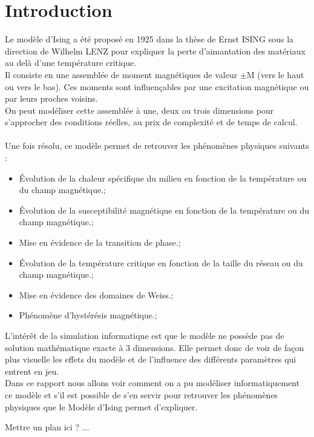 \section*{Introduction}

Le modèle d'Ising a été proposé en 1925 dans la thèse de Ernst ISING sous la direction de Wilhelm LENZ pour expliquer la perte d'aimantation des matériaux au delà d'une température critique.\\
Il consiste en une assemblée de moment magnétiques de valeur $\pm$M (vers le haut ou vers le bas). Ces moments sont influençables par une excitation magnétique ou par leurs proches voisins.\\
On peut modéliser cette assemblée à une, deux ou trois dimensions pour s'approcher des conditions réelles, au prix de complexité et de temps de calcul.\\
\\
Une fois résolu, ce modèle permet de retrouver les phénomènes physiques suivants :\\
\begin{itemize}
\item Évolution de la chaleur spécifique du milieu en fonction de la température ou du champ magnétique.;
\item Évolution de la susceptibilité magnétique en fonction de la température ou du champ magnétique.;
\item Mise en évidence de la transition de phase.;
\item Évolution de la température critique en fonction de la taille du réseau ou du champ magnétique.;
\item Mise en évidence des domaines de Weiss.;
\item Phénomène d'hystérésis magnétique.;
\end{itemize}
\vspace{\parskip} %

L'intérêt de la simulation informatique est que le modèle ne possède pas de solution mathématique exacte à 3 dimensions. Elle permet donc de voir de façon plus visuelle les effets du modèle et de l'influence des différents paramètres qui entrent en jeu.\\
Dans ce rapport nous allons voir comment on a pu modéliser informatiquement ce modèle et s'il est possible de s'en servir pour retrouver les phénomènes physiques que le Modèle d'Ising permet d'expliquer.\vspace{\parskip}

Mettre un plan ici ? ...